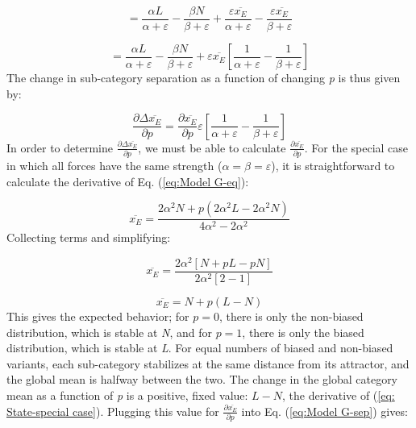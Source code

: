 \begin{equation}
=\frac{\alpha L}{\alpha+\varepsilon}-\frac{\beta N}{\beta+\varepsilon}+\frac{\varepsilon\overline{x_{E}}}{\alpha+\varepsilon}-\frac{\varepsilon\overline{x_{E}}}{\beta+\varepsilon}
\end{equation}

\begin{equation}
=\frac{\alpha L}{\alpha+\varepsilon}-\frac{\beta N}{\beta+\varepsilon}+\varepsilon\overline{x_{E}}\left[\frac{1}{\alpha+\varepsilon}-\frac{1}{\beta+\varepsilon}\right]
\end{equation}
The change in sub-category separation as a function of changing \emph{p}
is thus given by:

\begin{equation}
\frac{\partial\Delta\overline{x_{E}}}{\partial p}=\frac{\partial\overline{x_{E}}}{\partial p}\varepsilon\left[\frac{1}{\alpha+\varepsilon}-\frac{1}{\beta+\varepsilon}\right]\label{eq:Model G-sep}
\end{equation}
In order to determine $\frac{\partial\Delta\overline{x_{E}}}{\partial p}$,
we must be able to calculate $\frac{\partial\overline{x_{E}}}{\partial p}$.
For the special case in which all forces have the same strength ($\alpha=\beta=\varepsilon$),
it is straightforward to calculate the derivative of Eq. (\ref{eq:Model G-eq}):

\begin{equation}
\overline{x_{E}}=\frac{2\alpha^{2}N+p(2\alpha^{2}L-2\alpha^{2}N)}{4\alpha^{2}-2\alpha^{2}}
\end{equation}
Collecting terms and simplifying:

\begin{equation}
\overline{x_{E}}=\frac{2\alpha^{2}[N+pL-pN]}{2\alpha^{2}[2-1]}
\end{equation}

\begin{equation}
\overline{x_{E}}=N+p(L-N)\label{eq: State-special case}
\end{equation}
This gives the expected behavior; for $p=0$, there is only the non-biased
distribution, which is stable at \emph{N}, and for $p=1$, there is
only the biased distribution, which is stable at \emph{L}. For equal
numbers of biased and non-biased variants, each sub-category stabilizes
at the same distance from its attractor, and the global mean is halfway
between the two. The change in the global category mean as a function
of \emph{p} is a positive, fixed value: $L-N$, the derivative of
(\ref{eq: State-special case}). Plugging this value for $\frac{\partial\overline{x_{E}}}{\partial p}$
into Eq. (\ref{eq:Model G-sep}) gives:


